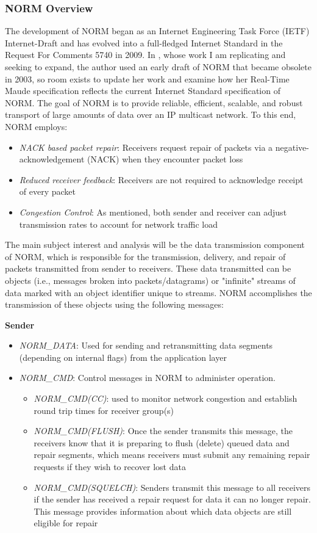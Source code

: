 \documentclass[10pt, journal]{IEEEtran}
\begin{document}
\subsubsection{NORM Overview}
The development of NORM began as an Internet Engineering Task Force (IETF) Internet-Draft and has evolved into a full-fledged Internet Standard in the Request For Comments 5740 \cite{rfc5740} in 2009. In \cite{Lien2004}, whose work I am replicating and seeking to expand, the author used an early draft of NORM that became obsolete in 2003, so room exists to update her work and examine how her Real-Time Maude specification reflects the current Internet Standard specification of NORM. The goal of NORM is to provide reliable, efficient, scalable, and robust transport of large amounts of data over an IP multicast network. To this end, NORM employs:
\begin{itemize}
	\item \textit{NACK based packet repair}: Receivers request repair of packets via a negative-acknowledgement (NACK) when they encounter packet loss
	\item \textit{Reduced receiver feedback}: Receivers are not required to acknowledge receipt of every packet
	\item \textit{Congestion Control}: As mentioned, both sender and receiver can adjust transmission rates to account for network traffic load
\end{itemize}

The main subject interest and analysis will be the data transmission component of NORM, which is responsible for the transmission, delivery, and repair of packets transmitted from sender to receivers. These data transmitted can be objects (i.e., messages broken into packets/datagrams) or "infinite" streams of data marked with an object identifier unique to streams. NORM accomplishes the transmission of these objects using the following messages:

\textbf{Sender}
\begin{itemize}
	\item \textit{NORM\_DATA}: Used for sending and retransmitting data segments (depending on internal flags) from the application layer
	\item \textit{NORM\_CMD}: Control messages in NORM to administer operation.
	\begin{itemize}
		\item \textit{NORM\_CMD(CC)}: used to monitor network congestion and establish round trip times for receiver group(s)
		\item \textit{NORM\_CMD(FLUSH)}: Once the sender transmits this message, the receivers know that it is preparing to flush (delete) queued data and repair segments, which means receivers must submit any remaining repair requests if they wish to recover lost data
		\item \textit{NORM\_CMD(SQUELCH)}: Senders transmit this message to all receivers if the sender has received a repair request for data it can no longer repair. This message provides information about which data objects are still eligible for repair
	\end{itemize}
\end{itemize}
\end{document}
